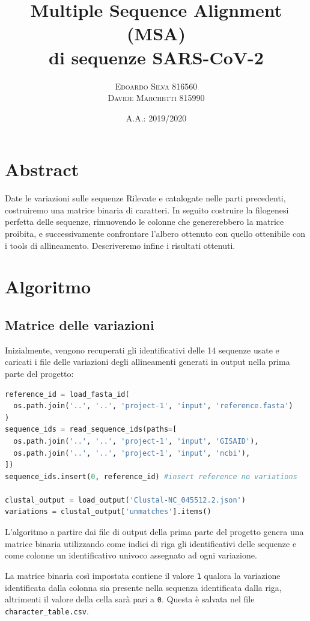 \documentclass[11pt,italian]{article}
\title{Multiple Sequence Alignment (MSA) \\ di sequenze SARS-CoV-2}
\date{A.A.: 2019/2020}
\author{
    \textsc{Edoardo Silva} 816560 \\
    \textsc{Davide Marchetti} 815990
}
\begin{document}
\maketitle

\section{Abstract}

Date le variazioni sulle sequenze Rilevate e catalogate nelle parti precedenti, costruiremo una matrice binaria di caratteri.\newline
In seguito costruire la filogenesi perfetta delle sequenze, rimuovendo le colonne che genererebbero la matrice proibita, e successivamente confrontare l’albero ottenuto con quello ottenibile con i tools di allineamento. \newline
Descriveremo infine i risultati ottenuti.

\newpage
\section{Algoritmo}
\subsection{Matrice delle variazioni}
Inizialmente, vengono recuperati gli identificativi delle 14 sequenze usate e caricati i file delle variazioni degli allineamenti generati in output nella prima parte del progetto:

\begin{lstlisting}[language=Python,caption=Caricamento dei file necessari per l'elaborazione,label=code:read_input_files]
reference_id = load_fasta_id(
  os.path.join('..', '..', 'project-1', 'input', 'reference.fasta')
)
sequence_ids = read_sequence_ids(paths=[
  os.path.join('..', '..', 'project-1', 'input', 'GISAID'),
  os.path.join('..', '..', 'project-1', 'input', 'ncbi'),
])
sequence_ids.insert(0, reference_id) #insert reference no variations

clustal_output = load_output('Clustal-NC_045512.2.json')
variations = clustal_output['unmatches'].items()
\end{lstlisting}

\noindent
L'algoritmo a partire dai file di output della prima parte del progetto genera una matrice binaria utilizzando come indici di riga gli identificativi delle sequenze e come colonne un identificativo univoco assegnato ad ogni variazione.

La matrice binaria così impostata contiene il valore \lstinline{1} qualora la variazione identificata dalla colonna sia presente nella sequenza identificata dalla riga, altrimenti il valore della cella sarà pari a \lstinline{0}.
Questa è salvata nel file \lstinline{character_table.csv}.
\end{document}
